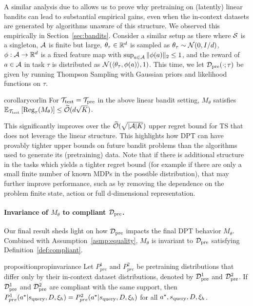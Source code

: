 A similar analysis due to \cite{russo2014learning} allows us to prove why pretraining on (latently) linear bandits can lead to substantial empirical gains, even when the in-context datasets are generated by algorithms unaware of this structure. We observed this empirically in Section~\ref {sec:bandits}. Consider a similar setup as there where ${\mathcal{S}}$ is a singleton, $\mathcal{A}$ is finite but large, $\theta_\tau \in \mathbb{R}^d$ is sampled as $\theta_{\tau} \sim \mathcal{N}(0, I/d)$,   $\phi: \mathcal{A} \to \mathbb{R}^d$ is a fixed feature map with $\sup_{a \in \mathcal{A}} \| \phi(a) \|_2 \leq 1$, and the reward of $a \in \mathcal{A}$ in task $\tau$ is distributed as $\mathcal{N}(\langle{\theta_\tau},{\phi(a)}\rangle, 1)$.  This time, we let $\mathcal{D}_{\text{pre}}(\cdot ; \tau)$ be given by running Thompson Sampling with Gaussian priors and likelihood functions on $\tau$.

\begin{restatable}{corollary}{corlin}
\label{cor:lin} For ${\mathcal{T}}_{\text{test}} = {\mathcal{T}}_{\text{pre}}$ in the above linear bandit setting, $M_{\theta}$ satisfies
   $\mathbb{E}_{{\mathcal{T}}_{\text{test}}} \left[ \text{Reg}_\tau(M_{\theta}) \right]  \leq \widetilde{\mathcal{O}} ( d\sqrt{   K }) $.
\end{restatable}


This significantly improves over the $\widetilde{\mathcal{O}}(\sqrt{|\mathcal{A}| K } )$ upper regret bound for TS that does not leverage the linear structure. This highlights how DPT can have provably tighter upper bounds on future bandit problems than the algorithms used to generate its (pretraining) data. Note that if there is additional structure in the tasks which yields a tighter regret bound (for example if there are only a small finite number of known MDPs in the possible distribution), that may further improve performance, such as by removing the dependence on the problem finite state, action or full d-dimensional representation. %

\paragraph{Invariance of $M_{\theta}$ to compliant $\mathcal{D}_{\text{pre}}$.} Our final result sheds light on how $\mathcal{D}_{\text{pre}}$ impacts the final DPT behavior $M_{\theta}$. Combined with Assumption~\ref{asmp:equality}, $M_{\theta}$ is invariant to $\mathcal{D}_{\text{pre}}$ satisfying Definition~\ref{def:compliant}.
\begin{restatable}{proposition}{propinvariance}
\label{prop:invariance}
Let $P_{pre}^1$ and $P_{pre}^2$ be pretraining distributions that differ only by their in-context dataset distributions, denoted by $\mathcal{D}_{\text{pre}}^1$ and $\mathcal{D}_{\text{pre}}^2$. If $\mathcal{D}_{\text{pre}}^1$ and $\mathcal{D}_{\text{pre}}^2$ are compliant with the same support, then $P_{pre}^1(a^\star| s_{\text{query}}, D, \xi_h) = P_{pre}^2(a^\star| s_{\text{query}}, D, \xi_h)$ for all $a^\star, s_{\text{query}}, D, \xi_h$.
\end{restatable}


